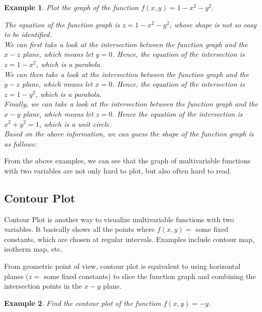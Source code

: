 \documentclass{article}
\newtheorem{example}{Example}
\begin{document}
\begin{example}
  Plot the graph of the function $f(x, y) = 1 - x^2 - y^2$.

  The equation of the function graph is $z = 1 - x^2 - y^2$, whose shape is not 
  so easy to be identified. \\
  We can first take a look at the intersection between the function graph and 
  the $x-z$ plane, which means let $y = 0$. Hence, the equation of the 
  intersection is $z = 1 - x^2$, which is a parabola. \\
  We can then take a look at the intersection between the function graph and the 
  $y-z$ plane, which means let $x = 0$. Hence, the equation of the intersection
  is $z = 1 - y^2$, which is a parabola. \\
  Finally, we can take a look at the intersection between the function graph and 
  the $x-y$ plane, which means let $z = 0$. Hence the equation of the 
  intersection is $x^2 + y^2 = 1$, which is a unit circle. \\
  Based on the above information, we can guess the shape of the function graph 
  is as follows:
\end{example}

From the above examples, we can see that the graph of multivariable functions 
with two variables are not only hard to plot, but also often hard to read.

\subsection{Contour Plot}

Contour Plot is another way to visualize multivariable functions with two 
variables. It basically shows all the points where $f(x, y) =$ some fixed 
constants, which are chosen at regular intervals. Examples include contour map,
isotherm map, etc.

From geometric point of view, contour plot is equivalent to using horizontal 
planes ($z =$ some fixed constants) to slice the function graph and combining 
the intersection points in the $x-y$ plane.

\begin{example}
  Find the contour plot of the function $f(x, y) = -y$.
  

\end{example}
\end{document}
